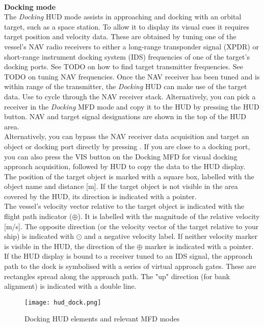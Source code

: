 \documentclass[Orbiter User Manual.tex]{subfiles}
\begin{document}
\noindent
\\
\textbf{Docking mode}\\
The \textit{Docking} HUD mode assists in approaching and docking with an orbital target, such as a space station. To allow it to display its visual cues it requires target position and velocity data. These are obtained by tuning one of the vessel's NAV radio receivers to either a long-range transponder signal (XPDR) or short-range instrument docking system (IDS) frequencies of one of the target's docking ports. See TODO on how to find target transmitter frequencies. See TODO on tuning NAV frequencies. Once the NAV receiver has been tuned and is within range of the transmitter, the \textit{Docking} HUD can make use of the target data. Use \Ctrl{} to cycle through the NAV receiver stack. Alternatively, you can pick a receiver in the \textit{Docking} MFD mode and copy it to the HUD by pressing the HUD button. NAV and target signal designations are shown in the top of the HUD area.\\
Alternatively, you can bypass the NAV receiver data acquisition and target an object or docking port directly by pressing \Ctrl\Alt{}. If you are close to a docking port, you can also press the VIS button on the Docking MFD for visual docking approach acquisition, followed by HUD to copy the data to the HUD display.\\
The position of the target object is marked with a square box, labelled with the object name and distance [m]. If the target object is not visible in the area covered by the HUD, its direction is indicated with a pointer.\\
The vessel's velocity vector relative to the target object is indicated with the flight path indicator ($\oplus$). It is labelled with the magnitude of the relative velocity [m/s]. The opposite direction (or the velocity vector of the target relative to your ship) is indicated with $\odot$ and a negative velocity label. If neither velocity marker is visible in the HUD, the direction of the $\oplus$ marker is indicated with a pointer.\\
If the HUD display is bound to a receiver tuned to an IDS signal, the approach path to the dock is symbolised with a series of virtual approach gates. These are rectangles spread along the approach path. The "up" direction (for bank alignment) is indicated with a double line.

\begin{figure}[H]
  \centering
  \texttt{[image: hud\_dock.png]}
  \caption{Docking HUD elements and relevant MFD modes}
\end{figure}
\end{document}
